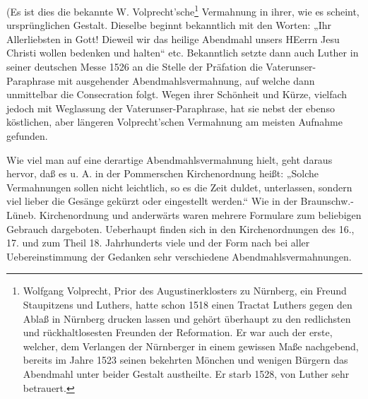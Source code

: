 (Es ist dies die bekannte W. Volprecht’sche\footnote{Wolfgang Volprecht, Prior des Augustinerklosters zu Nürnberg, ein Freund Staupitzens und Luthers, hatte schon 1518 einen Tractat Luthers gegen den Ablaß in Nürnberg drucken lassen und gehört überhaupt zu den redlichsten und rückhaltlosesten Freunden der Reformation. Er war auch der erste, welcher, dem Verlangen der Nürnberger in einem gewissen Maße nachgebend, bereits im Jahre 1523 seinen bekehrten Mönchen und wenigen Bürgern das Abendmahl unter beider Gestalt austheilte. Er starb 1528, von Luther sehr betrauert.} Vermahnung in ihrer, wie es scheint, ursprünglichen Gestalt. Dieselbe beginnt bekanntlich mit den Worten: „Ihr Allerliebsten in Gott! Dieweil wir das heilige Abendmahl unsers HEerrn Jesu Christi wollen bedenken und halten“ etc. Bekanntlich setzte dann auch Luther in seiner deutschen Messe 1526 an die Stelle der Präfation die Vaterunser-Paraphrase mit ausgehender Abendmahlsvermahnung, auf welche dann unmittelbar die Consecration folgt. Wegen ihrer Schönheit und Kürze, vielfach jedoch mit Weglassung der Vaterunser-Paraphrase, hat sie nebst der ebenso köstlichen, aber längeren Volprecht’schen Vermahnung am meisten Aufnahme gefunden.

Wie viel man auf eine derartige Abendmahlsvermahnung hielt, geht daraus hervor, daß es u. A. in der Pommerschen Kirchenordnung heißt: „Solche Vermahnungen sollen nicht leichtlich, so es die Zeit duldet, unterlassen, sondern viel lieber die Gesänge gekürzt oder eingestellt werden.“ Wie in der Braunschw.-Lüneb. Kirchenordnung und anderwärts waren mehrere Formulare zum beliebigen Gebrauch dargeboten. Ueberhaupt finden sich in den Kirchenordnungen des 16., 17. und zum Theil 18. Jahrhunderts viele und der Form nach bei aller Uebereinstimmung der Gedanken sehr verschiedene Abendmahlsvermahnungen.

